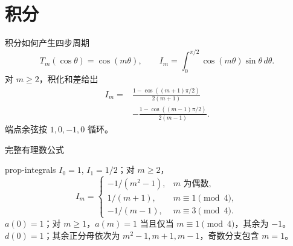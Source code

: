 \documentclass{beamer}
\begin{document}
\section{积分}
\begin{frame}{积分如何产生四步周期}
\[
T_m(\cos\theta)=\cos(m\theta),\qquad
I_m=\int_0^{\pi/2}\cos(m\theta)\sin\theta\,d\theta.
\]
对 $m\ge2$，积化和差给出
\[
\begin{aligned}
I_m={}&\frac{1-\cos((m+1)\pi/2)}{2(m+1)}\\
&-\frac{1-\cos((m-1)\pi/2)}{2(m-1)}.
\end{aligned}
\]
端点余弦按 $1,0,-1,0$ 循环。
\end{frame}
\begin{frame}{完整有理数公式}
\small
\begin{bookresult}{prop-integrals}
$I_0=1$, $I_1=1/2$；对 $m\ge2$，
\[
I_m=\begin{cases}-1/(m^2-1),&m\text{ 为偶数},\\1/(m+1),&m\equiv1\pmod4,\\-1/(m-1),&m\equiv3\pmod4.\end{cases}
\]
$a(0)=1$；对 $m\ge1$，$a(m)=1$ 当且仅当 $m\equiv1\pmod4$，其余为 $-1$。
$d(0)=1$；其余正分母依次为 $m^2-1,m+1,m-1$，奇数分支包含 $m=1$。
\end{bookresult}
\end{frame}
\end{document}
